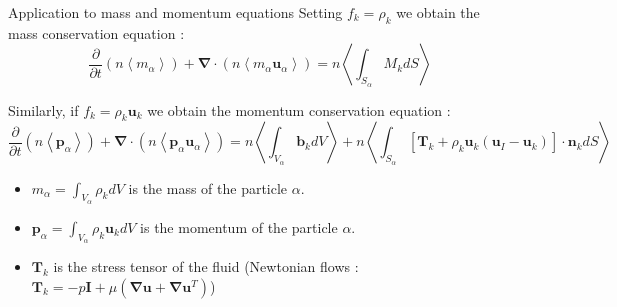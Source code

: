 \documentclass{sintefbeamer}
\newcommand{\pavg}[1]{n \left<#1\right>}
\newcommand{\nablab}{\bm{\nabla}}
\newcommand{\pddt}{\frac{\partial}{\partial t}}
\begin{document}
\begin{frame}
  {Application to mass and momentum equations}
  Setting $f_k = \rho_k$ we obtain the mass conservation equation :
  \begin{equation}
    \pddt   \left(\pavg{m_\alpha}\right)
    + \nablab \cdot \left(\pavg{m_\alpha \textbf{u}_\alpha}\right) 
    = 
     \pavg{\int_{S_\alpha} M_k d S}
    \label{eq:avg_p_mass}
\end{equation}

Similarly, if $f_k = \rho_k \textbf{u}_k$ we obtain the momentum conservation equation :
\begin{equation}
    \pddt   \left(\pavg{\textbf{p}_\alpha}\right)
    + \nablab \cdot \left(\pavg{\textbf{p}_\alpha \textbf{u}_\alpha}\right) 
    = \pavg{\int_{V_\alpha} \textbf{b}_k dV}
    + \pavg{\int_{S_\alpha} \left[
      \textbf{T}_k + \rho_k \textbf{u}_k (\textbf{u}_I-\textbf{u}_k) 
      \right] \cdot \textbf{n}_k d S}
    \label{eq:avg_p_global}
\end{equation}
\begin{itemize}
  \item $m_\alpha = \int_{V_\alpha} \rho_k dV$ is the mass of the particle $\alpha$.
  \item $\textbf{p}_\alpha = \int_{V_\alpha} \rho_k \textbf{u}_k dV$ is the momentum of the particle $\alpha$.
  \item $\textbf{T}_k$ is the stress tensor of the fluid (Newtonian flows : $\textbf{T}_k = -p\textbf{I} + \mu (\nablab \textbf{u}+ \nablab \textbf{u}^T) $)
\end{itemize}
\end{frame}
  
\end{document}
